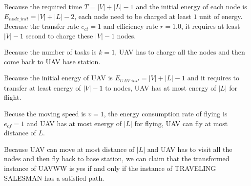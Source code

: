 \documentclass[11pt]{article}
\begin{document}
Because the required time $T = |V| + |L| - 1$ and the initial energy of each node is $E_{node\_init} = |V| + |L| - 2$, each node need to be charged at least $1$ unit of energy. Because the transfer rate $e_{ct} = 1$ and efficiency rate $r = 1.0$, it requires at least $|V| - 1$ second to charge these $|V| - 1$ nodes.

Because the number of tasks is $k = 1$, UAV has to charge all the nodes and then come back to UAV base station.

Because the initial energy of UAV is $E_{UAV\_init} = |V| + |L| - 1$ and it requires to transfer at least energy of $|V| - 1$ to nodes, UAV has at most energy of $|L|$ for flight. 

Becuse the moving speed is $v = 1$, the energy consumption rate of flying is  $e_{cf} = 1$ and UAV has at most energy of $|L|$ for flying, UAV can fly at most distance of $L$.

Because UAV can move at most distance of $|L|$ and UAV has to visit all the nodes and then fly back to base station, we can claim that the transformed instance of UAVWW is yes if and only if the instance of TRAVELING SALESMAN has a satisfied path.
\end{document}
